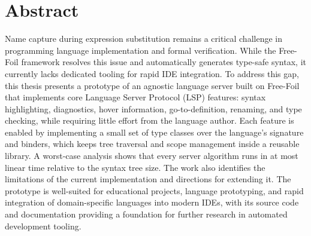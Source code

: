 \chapter*{Abstract}

Name capture during expression substitution remains a critical challenge in programming language implementation and formal verification.
While the Free-Foil framework resolves this issue and automatically generates type-safe syntax, it currently lacks dedicated tooling for rapid IDE integration.
To address this gap, this thesis presents a prototype of an agnostic language server built on Free-Foil that implements core Language Server Protocol (LSP) features: syntax highlighting, diagnostics, hover information, go-to-definition, renaming, and type checking, while requiring little effort from the language author.
Each feature is enabled by implementing a small set of type classes over the language's signature and binders, which keeps tree traversal and scope management inside a reusable library.
A worst-case analysis shows that every server algorithm runs in at most linear time relative to the syntax tree size.
The work also identifies the limitations of the current implementation and directions for extending it.
The prototype is well-suited for educational projects, language prototyping, and rapid integration of domain-specific languages into modern IDEs, with its source code and documentation providing a foundation for further research in automated development tooling.
